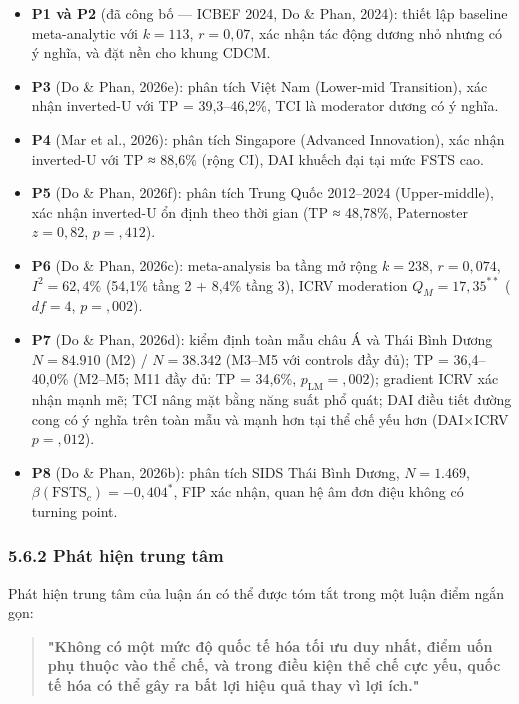 \documentclass[12pt,a4paper]{article}
\begin{document}
\begin{itemize}
\item
  \textbf{P1 và P2} (đã công bố --- ICBEF 2024, Do \& Phan, 2024): thiết
  lập baseline meta-analytic với \(k = 113\), \(r = 0{,}07\), xác nhận
  tác động dương nhỏ nhưng có ý nghĩa, và đặt nền cho khung CDCM.
\item
  \textbf{P3} (Do \& Phan, 2026e): phân tích Việt Nam (Lower-mid
  Transition), xác nhận inverted-U với TP = 39,3--46,2\%, TCI là
  moderator dương có ý nghĩa.
\item
  \textbf{P4} (Mar et al., 2026): phân tích Singapore (Advanced
  Innovation), xác nhận inverted-U với TP ≈ 88,6\% (rộng CI), DAI khuếch
  đại tại mức FSTS cao.
\item
  \textbf{P5} (Do \& Phan, 2026f): phân tích Trung Quốc 2012--2024
  (Upper-middle), xác nhận inverted-U ổn định theo thời gian (TP ≈
  48,78\%, Paternoster \(z = 0{,}82\), \(p = {,}412\)).
\item
  \textbf{P6} (Do \& Phan, 2026c): meta-analysis ba tầng mở rộng
  \(k = 238\), \(r = 0{,}074\), \(I^2 = 62{,}4\%\) (54,1\% tầng 2 +
  8,4\% tầng 3), ICRV moderation \(Q_M = 17{,}35^{**}\) (\(df = 4\),
  \(p = {,}002\)).
\item
  \textbf{P7} (Do \& Phan, 2026d): kiểm định toàn mẫu châu Á và Thái
  Bình Dương \(N = 84.910\) (M2) / \(N = 38.342\) (M3--M5 với controls
  đầy đủ); TP = 36,4--40,0\% (M2--M5; M11 đầy đủ: TP = 34,6\%,
  \(p_\text{LM} = {,}002\)); gradient ICRV xác nhận mạnh mẽ; TCI nâng
  mặt bằng năng suất phổ quát; DAI điều tiết đường cong có ý nghĩa trên
  toàn mẫu và mạnh hơn tại thể chế yếu hơn (DAI×ICRV \(p = {,}012\)).
\item
  \textbf{P8} (Do \& Phan, 2026b): phân tích SIDS Thái Bình Dương,
  \(N = 1.469\), \(\beta(\text{FSTS}_c) = -0{,}404^{*}\), FIP xác nhận,
  quan hệ âm đơn điệu không có turning point.
\end{itemize}

\hypertarget{562-phuxe1t-hiux1ec7n-trung-tuxe2m}{%
\subsubsection{5.6.2 Phát hiện trung
tâm}\label{562-phuxe1t-hiux1ec7n-trung-tuxe2m}}

Phát hiện trung tâm của luận án có thể được tóm tắt trong một luận điểm
ngắn gọn:

\begin{quote}
\textbf{"Không có một mức độ quốc tế hóa tối ưu duy nhất, điểm uốn phụ
thuộc vào thể chế, và trong điều kiện thể chế cực yếu, quốc tế hóa có
thể gây ra bất lợi hiệu quả thay vì lợi ích."}
\end{quote}
\end{document}
